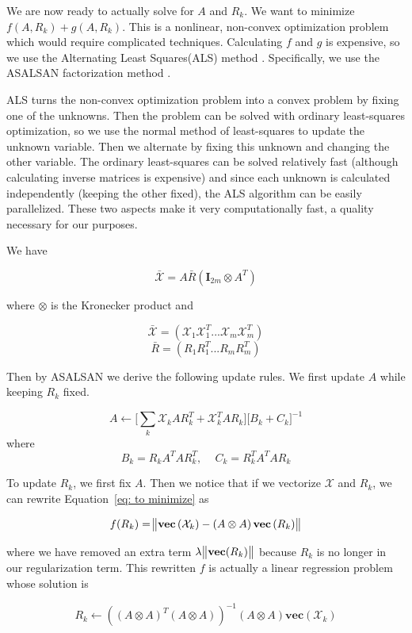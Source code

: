 \documentclass[pageno]{final_paper}
\begin{document}
We are now ready to actually solve for $A$ and $R_k$. We want to minimize $f(A,
R_k) + g(A, R_k)$. This is a nonlinear, non-convex optimization problem which
would require complicated techniques. Calculating $f$ and $g$ is expensive, so
we use the Alternating Least Squares(ALS) method \cite{Koren2009}. Specifically,
we use the ASALSAN factorization method \cite{Bader2007}.

ALS turns the non-convex optimization problem into a convex problem by fixing
one of the unknowns. Then the problem can be solved with ordinary least-squares
optimization, so we use the normal method of least-squares to update the unknown
variable. Then we alternate by fixing this unknown and changing the other
variable. The ordinary least-squares can be solved relatively fast (although
calculating inverse matrices is expensive) and since each unknown is calculated
independently (keeping the other fixed), the ALS algorithm can be easily
parallelized. These two aspects make it very computationally fast, a quality
necessary for our purposes.

We have

$$\bar{\mathcal{X}} = A\bar{R}(\mathbf{I}_{2m} \otimes A^T)$$

where $\otimes$ is the Kronecker product and

$$\bar{\mathcal{X}} = \left( \mathcal{X}_1\mathcal{X}_1^T ... \mathcal{X}_m\mathcal{X}_m^T \right)$$
$$\bar{R} = \left( R_1 R_1^T ... R_mR_m^T \right)$$

Then by ASALSAN we derive the following update rules. We first update $A$ while
keeping $R_k$ fixed.

$$A \leftarrow \bigg[ \sum_k \mathcal{X}_kAR_k^T + \mathcal{X}_k^TAR_k \bigg] \bigg[ B_k + C_k \bigg]^{-1}$$
where
$$B_k = R_k A^T AR_k^T,\,\,\,\,\,\,\, C_k = R_k^TA^TAR_k$$

To update $R_k$, we first fix $A$. Then we notice that if we vectorize
$\mathcal{X}$ and $R_k$, we can rewrite Equation~\eqref{eq: to minimize} as

$$f(R_k) = \norm{\textbf{vec}\left(\mathcal{X}_k\right) - \left(A \otimes A \right)
\textbf{vec}\left(R_k\right)}$$

where we have removed an extra term $\lambda \norm{\textbf{vec}(R_k)}$ because
$R_k$ is no longer in our regularization term. This rewritten $f$ is actually
a linear regression problem whose solution is

$$R_k \leftarrow \left( \left(A \otimes A \right)^T \left(A \otimes A\right)
 \right) ^{-1} \left(A \otimes A\right) \textbf{vec}\left(\mathcal{X}_k\right)$$
\end{document}
